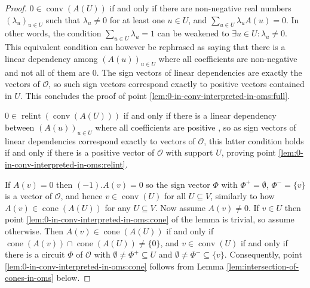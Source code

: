 \documentclass[a4paper,11pt,reqno, english]{amsart}
\theoremstyle{definition}
\theoremstyle{remark}
\DeclareMathOperator{\cone}{\mathrm{cone}}
\DeclareMathOperator{\relint}{\mathrm{relint}}
\DeclareMathOperator{\conv}{\mathrm{conv}}
\begin{document}
\begin{proof}
    $0\in\conv(A(U))$ if and only if there are non-negative real numbers $(\lambda_u)_{u\in U}$ such that $\lambda_u\neq 0$ for at least one $u\in U$, and $\sum_{u\in U}\lambda_uA(u)=0$. In other words, the condition $\sum_{u\in U}\lambda_u=1$ can be weakened to $\exists u\in U\colon \lambda_u\neq 0$. This equivalent condition can however be rephrased as saying that there is a linear dependency among $(A(u))_{u\in U}$ where all coefficients are non-negative and not all of them are $0$. The sign vectors of linear dependencies are exactly the vectors of $\mathscr{O}$, so such sign vectors correspond exactly to positive vectors contained in $U$. This concludes the proof of point \ref{lem:0-in-conv-interpreted-in-oms:full}.

    $0\in\relint(\conv(A(U)))$ if and only if there is a linear dependency between $(A(u))_{u\in U}$ where all coefficients are positive \cite[p. 11, Theorem 6]{McMullenShephard}, so as sign vectors of linear dependencies correspond exactly to vectors of $\mathscr{O}$, this latter condition holds if and only if there is a positive vector of $\mathscr{O}$ with support $U$, proving point \ref{lem:0-in-conv-interpreted-in-oms:relint}.

    If $A(v)=0$ then $(-1).A(v)=0$ so the sign vector $\Phi$ with $\Phi^+=\emptyset$, $\Phi^-=\{v\}$ is a vector of $\mathscr{O}$, and hence $v\in\conv(U)$ for all $U\subseteq V$, similarly to how $A(v)\in\cone(A(U))$ for any $U\subseteq V$.
    Now assume $A(v)\neq 0$. If $v\in U$ then point \ref{lem:0-in-conv-interpreted-in-oms:cone} of the lemma is trivial, so assume otherwise. Then $A(v)\in\cone(A(U))$ if and only if $\cone(A(v))\cap\cone(A(U))\neq \{0\}$, and $v\in\conv(U)$ if and only if there is a circuit $\Phi$ of $\mathscr{O}$ with $\emptyset\neq\Phi^+\subseteq U$ and $\emptyset\neq\Phi^-\subseteq\{v\}$. Consequently, point \ref{lem:0-in-conv-interpreted-in-oms:cone} follows from Lemma \ref{lem:intersection-of-cones-in-oms} below.


\end{proof}
\end{document}
